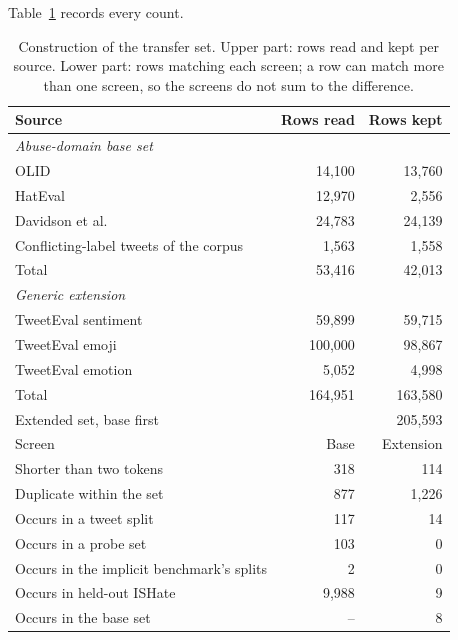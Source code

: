 Table~\ref{tab:transfer} records every count.

\begin{table}[htbp]
\centering
\small
\caption[Construction of the transfer set]{Construction of the transfer set. Upper part: rows read and kept per source. Lower part: rows
matching each screen; a row can match more than one screen, so the screens do not sum to the difference.}
\label{tab:transfer}
\begin{tabular}{lrr}
\toprule
Source & Rows read & Rows kept \\
\midrule
\multicolumn{3}{l}{\emph{Abuse-domain base set}} \\
OLID \cite{zampieri2019olid} & 14,100 & 13,760 \\
HatEval \cite{basile2019hateval} & 12,970 & 2,556 \\
Davidson et al. \cite{davidson2017automated} & 24,783 & 24,139 \\
Conflicting-label tweets of the corpus & 1,563 & 1,558 \\
Total & 53,416 & 42,013 \\
\midrule
\multicolumn{3}{l}{\emph{Generic extension}} \\
TweetEval sentiment & 59,899 & 59,715 \\
TweetEval emoji & 100,000 & 98,867 \\
TweetEval emotion & 5,052 & 4,998 \\
Total & 164,951 & 163,580 \\
\midrule
Extended set, base first & & 205,593 \\
\midrule
Screen & Base & Extension \\
\midrule
Shorter than two tokens & 318 & 114 \\
Duplicate within the set & 877 & 1,226 \\
Occurs in a tweet split & 117 & 14 \\
Occurs in a probe set & 103 & 0 \\
Occurs in the implicit benchmark's splits & 2 & 0 \\
Occurs in held-out ISHate & 9,988 & 9 \\
Occurs in the base set & -- & 8 \\
\bottomrule
\end{tabular}
\end{table}

